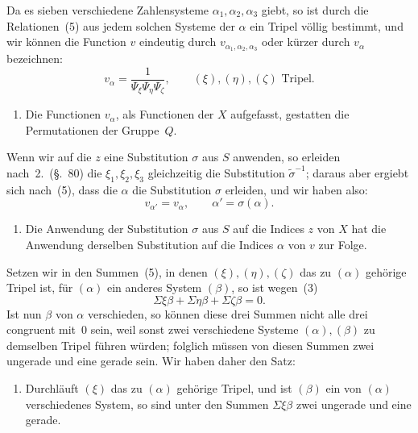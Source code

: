 \documentclass[12pt,a4paper]{article}
\begin{document}
Da es sieben verschiedene Zahlensysteme $\alpha_1,\alpha_2,\alpha_3$ giebt, so ist durch die Relationen~(5) aus jedem solchen Systeme der $\alpha$ ein Tripel v\"ollig bestimmt, und wir k\"onnen die Function $v$ eindeutig durch $v_{\alpha_1,\alpha_2,\alpha_3}$ oder k\"urzer durch $v_{\alpha}$ bezeichnen:
\begin{equation}
\tag{6}
v_{\alpha} = \frac{1}{\Psi_{\xi}\Psi_{\eta}\Psi_{\zeta}},\qquad (\xi),(\eta),(\zeta) \text{ Tripel}.
\end{equation}

\begin{enumerate}
\item[3.] Die Functionen $v_{\alpha}$, als Functionen der $X$ aufgefasst, gestatten die Permutationen der Gruppe~$Q$.
\end{enumerate}

Wenn wir auf die $z$ eine Substitution $\sigma$ aus $S$ anwenden, so erleiden nach~2.\ (\S.~80) die $\xi_1,\xi_2,\xi_3$ gleichzeitig die Substitution $\tilde\sigma^{-1}$; daraus aber ergiebt sich nach~(5), dass die $\alpha$ die Substitution $\sigma$ erleiden, und wir haben also:
\begin{equation}
\tag{7}
v_{\alpha'} = v_{\alpha},\qquad \alpha' = \sigma(\alpha).
\end{equation}
\begin{enumerate}
\item[4.] Die Anwendung der Substitution $\sigma$ aus $S$ auf die Indices $z$ von $X$ hat die Anwendung der\-selben Substitution auf die Indices $\alpha$ von $v$ zur Folge.
\end{enumerate}

Setzen wir in den Summen~(5), in denen $(\xi),(\eta),(\zeta)$ das zu $(\alpha)$ geh\"orige Tripel ist, f\"ur $(\alpha)$ ein anderes System $(\beta)$, so ist wegen~(3)
\[
\Sigma\xi\beta + \Sigma\eta\beta + \Sigma\zeta\beta = 0.
\]
Ist nun $\beta$ von $\alpha$ verschieden, so k\"onnen diese drei Summen nicht alle drei congruent mit~0 sein, weil sonst zwei verschiedene Systeme $(\alpha),(\beta)$ zu demselben Tripel f\"uhren w\"urden; folglich m\"ussen von diesen Summen zwei ungerade und eine gerade sein. Wir haben daher den Satz:

\begin{enumerate}
\item[5.] Durchl\"auft $(\xi)$ das zu $(\alpha)$ geh\"orige Tripel, und ist $(\beta)$ ein von $(\alpha)$ verschiedenes System, so sind unter den Summen $\Sigma\xi\beta$ zwei ungerade und eine gerade.
\end{enumerate}
\end{document}
